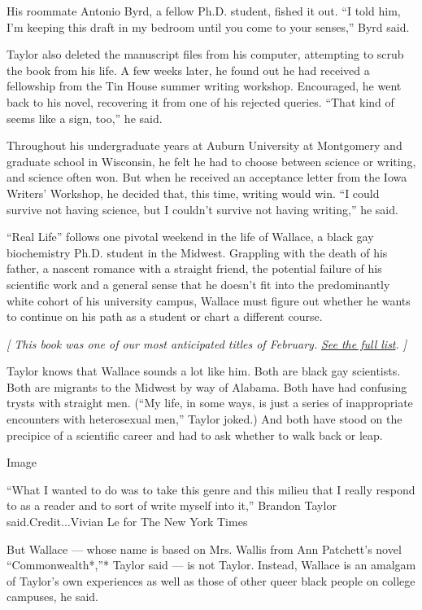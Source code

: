 His roommate Antonio Byrd, a fellow Ph.D. student, fished it out. ``I
told him, I'm keeping this draft in my bedroom until you come to your
senses,'' Byrd said.

Taylor also deleted the manuscript files from his computer, attempting
to scrub the book from his life. A few weeks later, he found out he had
received a fellowship from the Tin House summer writing workshop.
Encouraged, he went back to his novel, recovering it from one of his
rejected queries. ``That kind of seems like a sign, too,'' he said.

Throughout his undergraduate years at Auburn University at Montgomery
and graduate school in Wisconsin, he felt he had to choose between
science or writing, and science often won. But when he received an
acceptance letter from the Iowa Writers' Workshop, he decided that, this
time, writing would win. ``I could survive not having science, but I
couldn't survive not having writing,'' he said.

``Real Life'' follows one pivotal weekend in the life of Wallace, a
black gay biochemistry Ph.D. student in the Midwest. Grappling with the
death of his father, a nascent romance with a straight friend, the
potential failure of his scientific work and a general sense that he
doesn't fit into the predominantly white cohort of his university
campus, Wallace must figure out whether he wants to continue on his path
as a student or chart a different course.

\emph{{[} This book was one of our most anticipated titles of February.}
\href{https://www.nytimes.com/2020/01/29/books/new-february-books.html?smid=nytcore-ios-share}{\emph{See
the full list}}\emph{. {]}}

Taylor knows that Wallace sounds a lot like him. Both are black gay
scientists. Both are migrants to the Midwest by way of Alabama. Both
have had confusing trysts with straight men. (``My life, in some ways,
is just a series of inappropriate encounters with heterosexual men,''
Taylor joked.) And both have stood on the precipice of a scientific
career and had to ask whether to walk back or leap.

Image

``What I wanted to do was to take this genre and this milieu that I
really respond to as a reader and to sort of write myself into it,''
Brandon Taylor said.Credit...Vivian Le for The New York Times

But Wallace --- whose name is based on Mrs. Wallis from Ann Patchett's
novel ``Commonwealth*,''* Taylor said --- is not Taylor. Instead,
Wallace is an amalgam of Taylor's own experiences as well as those of
other queer black people on college campuses, he said.

